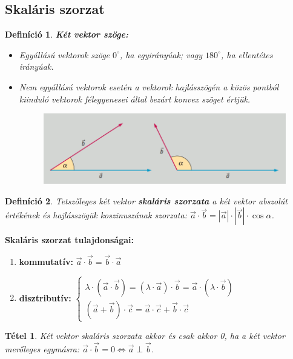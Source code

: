 \documentclass[12pt,a4paper]{article}
\newtheorem{theorem}{Tétel} [section]
\newtheorem{definition}{Definíció} [section]
\begin{document}
\subsection{Skaláris szorzat}
\begin{definition}
\textbf{Két vektor szöge:}
\begin{itemize}
\item Egyállású vektorok szöge $0^\circ$, ha egyirányúak; vagy $180^\circ$, ha ellentétes irányúak.
\item Nem egyállású vektorok esetén a vektorok hajlásszögén a közös pontból kiinduló vektorok félegyenesei által bezárt konvex szöget értjük.
\begin{figure}[h!]
\centering
\includegraphics[scale=0.3]{geometry/vektor_szog}
\end{figure}
\end{itemize}
\end{definition}
\newpage
\begin{definition}
Tetszőleges két vektor \textbf{skaláris szorzata} a két vektor abszolút értékének és hajlásszögük koszinuszának szorzata: $\vec{a}\cdot \vec{b}=|\vec{a}|\cdot|\vec{b}|\cdot\cos \alpha$.
\end{definition}

\textbf{Skaláris szorzat tulajdonságai:}
\begin{enumerate}
\item \textbf{kommutatív:} $\vec{a}\cdot \vec{b}=\vec{b}\cdot \vec{a}$
\item \textbf{disztributív:} $\begin{cases}\lambda\cdot(\vec{a}\cdot\vec{b})=(\lambda\cdot\vec{a})\cdot\vec{b}=\vec{a}\cdot(\lambda\cdot\vec{b})\\(\vec{a}+\vec{b})\cdot \vec{c} =\vec{a}\cdot \vec{c} +\vec{b}\cdot \vec{c}  \end{cases}$
\end{enumerate}

\begin{theorem}
Két vektor skaláris szorzata akkor és csak akkor 0, ha a két vektor merőleges egymásra: $\vec{a}\cdot\vec{b}=0\Leftrightarrow \vec{a}\perp \vec{b}$.
\end{theorem}
\end{document}

